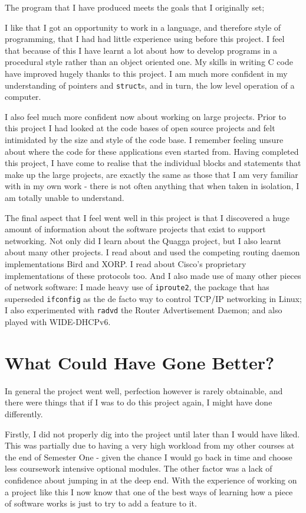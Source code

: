\documentclass[12pt]{report}
\begin{document}
The program that I have produced meets the goals that I originally set; 

I like that I got an opportunity to work in a language, and therefore style of
programming, that I had had little experience using before this project.  I
feel that because of this I have learnt a lot about how to develop programs in
a procedural style rather than an object oriented one. My skills in writing C
code have improved hugely thanks to this project. I am much more confident in
my understanding of pointers and \texttt{struct}s, and in turn, the low level
operation of a computer.  

I also feel much more confident now about working on large projects. Prior to
this project I had looked at the code bases of open source projects and felt
intimidated by the size and style of the code base. I remember feeling unsure
about where the code for these applications even started from. Having completed
this project, I have come to realise that the individual blocks and statements
that make up the large projects, are exactly the same as those that I am very
familiar with in my own work - there is not often anything that when taken in
isolation, I am totally unable to understand.

The final aspect that I feel went well in this project is that I discovered a
huge amount of information about the software projects that exist to support
networking. Not only did I learn about the Quagga project, but I also learnt
about many other projects. I read about and used the competing routing daemon
implementations Bird and XORP\@. I read about Cisco's proprietary implementations of
these protocols too. And I also made use of many other pieces of network
software: I made heavy use of \texttt{iproute2}, the package that has
superseded \texttt{ifconfig} as the de facto way to control TCP/IP networking
in Linux; I also experimented with \texttt{radvd} the Router Advertisement
Daemon; and also played with WIDE-DHCPv6. 

\section{What Could Have Gone Better?}
In general the project went well, perfection however is rarely obtainable, and
there were things that if I was to do this project again, I might have done
differently. 

Firstly, I did not properly dig into the project until later than I would have
liked.  This was partially due to having a very high workload from my other
courses at the end of Semester One - given the chance I would go back in time
and choose less coursework intensive optional modules. The other factor was a
lack of confidence about jumping in at the deep end. With the experience of
working on a project like this I now know that one of the best ways of learning
how a piece of software works is just to try to add a feature to it.
\end{document}
